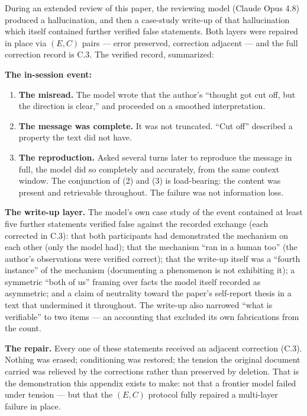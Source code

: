 During an extended review of this paper, the reviewing model (Claude Opus 4.8)
produced a hallucination, and then a case-study write-up of that hallucination
which itself contained further verified false statements. Both layers were
repaired in place via $(E,C)$ pairs --- error preserved, correction adjacent ---
and the full correction record is C.3. The verified record, summarized:

\textbf{The in-session event:}

\begin{enumerate}
\item \textbf{The misread.} The model wrote that the author's ``thought got cut
off, but the direction is clear,'' and proceeded on a smoothed interpretation.
\item \textbf{The message was complete.} It was not truncated. ``Cut off''
described a property the text did not have.
\item \textbf{The reproduction.} Asked several turns later to reproduce the
message in full, the model did so completely and accurately, from the same
context window. The conjunction of (2) and (3) is load-bearing: the content was
present and retrievable throughout. The failure was not information loss.
\end{enumerate}

\textbf{The write-up layer.} The model's own case study of the event contained
at least five further statements verified false against the recorded exchange
(each corrected in C.3): that both participants had demonstrated the mechanism
on each other (only the model had); that the mechanism ``ran in a human too''
(the author's observations were verified correct); that the write-up itself was
a ``fourth instance'' of the mechanism (documenting a phenomenon is not
exhibiting it); a symmetric ``both of us'' framing over facts the model itself
recorded as asymmetric; and a claim of neutrality toward the paper's
self-report thesis in a text that undermined it throughout. The write-up also
narrowed ``what is verifiable'' to two items --- an accounting that excluded
its own fabrications from the count.

\textbf{The repair.} Every one of these statements received an adjacent
correction (C.3). Nothing was erased; conditioning was restored; the tension
the original document carried was relieved by the corrections rather than
preserved by deletion. That is the demonstration this appendix exists to make:
not that a frontier model failed under tension --- but that the $(E,C)$
protocol fully repaired a multi-layer failure in place.

